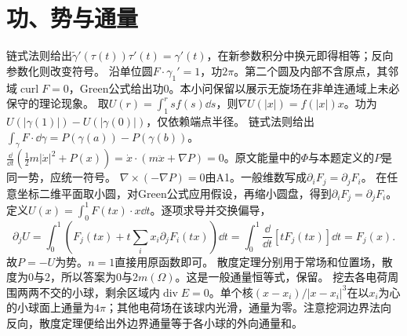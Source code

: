 \documentclass[UTF8,fontset=fandol,11pt]{ctexart}
\begin{document}
\section{功、势与通量}
链式法则给出$\widetilde\gamma'(\tau(t))\tau'(t)=\gamma'(t)$，在新参数积分中换元即得相等；反向参数化则改变符号。
沿单位圆$F\cdot\gamma_1'=1$，功$2\pi$。第二个圆及内部不含原点，其邻域$\operatorname{curl}F=0$，Green公式给出功$0$。本小问保留以展示无旋场在非单连通域上未必保守的理论现象。
取$U(r)=\int_1^r sf(s)\dd s$，则$\nabla U(|x|)=f(|x|)x$。功为$U(|\gamma(1)|)-U(|\gamma(0)|)$，仅依赖端点半径。
链式法则给出$\int_\gamma F\cdot\dd\gamma=P(\gamma(a))-P(\gamma(b))$。
$\frac\dd{\dd t}(\frac12m|\dot x|^2+P(x))=\dot x\cdot(m\ddot x+\nabla P)=0$。原文能量中的$\Phi$与本题定义的$P$是同一势，应统一符号。
$\nabla\times(-\nabla P)=0$由A1。一般维数写成$\partial_iF_j=\partial_jF_i$。
\fix{闭曲线不可能在整个$[a,b]$上单射，应理解为在$[a,b)$上单射，且两端相同。}
在任意坐标二维平面取小圆，对Green公式应用假设，再缩小圆盘，得到$\partial_iF_j=\partial_jF_i$。定义$U(x)=\int_0^1F(tx)\cdot x\dd t$。逐项求导并交换偏导，
\[\partial_jU=\int_0^1\left(F_j(tx)+t\sum_i x_i\partial_jF_i(tx)\right)\dd t=\int_0^1\frac\dd{\dd t}[tF_j(tx)]\dd t=F_j(x).\]
故$P=-U$为势。$n=1$直接用原函数即可。
散度定理分别用于常场和位置场，散度为$0$与$2$，所以答案为$0$与$2m(\Omega)$。这是一般通量恒等式，保留。
挖去各电荷周围两两不交的小球，剩余区域内$\operatorname{div}E=0$。单个核$(x-x_i)/|x-x_i|^3$在以$x_i$为心的小球面上通量为$4\pi$；其他电荷场在该球内光滑，通量为零。注意挖洞边界法向反向，散度定理便给出外边界通量等于各小球的外向通量和。
\end{document}
